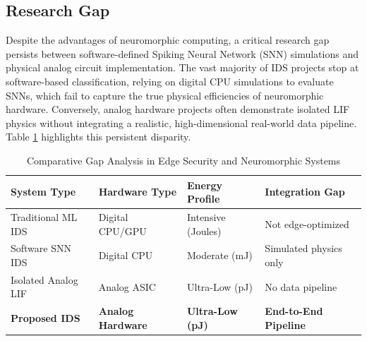 \documentclass{ieeeaccess}
\begin{document}
\subsection{Research Gap}
Despite the advantages of neuromorphic computing, a critical research gap persists between software-defined Spiking Neural Network (SNN) simulations and physical analog circuit implementation. The vast majority of IDS projects stop at software-based classification, relying on digital CPU simulations to evaluate SNNs, which fail to capture the true physical efficiencies of neuromorphic hardware. Conversely, analog hardware projects often demonstrate isolated LIF physics without integrating a realistic, high-dimensional real-world data pipeline. Table \ref{tab:gap_analysis} highlights this persistent disparity.

\begin{table}[!t]
\centering
\caption{Comparative Gap Analysis in Edge Security and Neuromorphic Systems}
\label{tab:gap_analysis}
\begin{tabular}{|p{}|p{}|p{}|p{}|}
\hline
\textbf{System Type} & \textbf{Hardware Type} & \textbf{Energy Profile} & \textbf{Integration Gap} \\
\hline
Traditional ML IDS & Digital CPU/GPU & Intensive (Joules) & Not edge-optimized \\
\hline
Software SNN IDS & Digital CPU & Moderate (mJ) & Simulated physics only \\
\hline
Isolated Analog LIF & Analog ASIC & Ultra-Low (pJ) & No data pipeline \\
\hline
\textbf{Proposed IDS} & \textbf{Analog Hardware} & \textbf{Ultra-Low (pJ)} & \textbf{End-to-End Pipeline} \\
\hline
\end{tabular}
\end{table}
\end{document}
